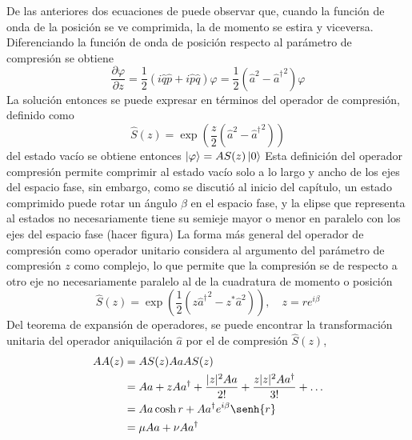 De las anteriores dos ecuaciones de puede observar que, cuando la función de onda de la posición se ve comprimida, la de momento se estira y viceversa. Diferenciando la función de onda de posición respecto al parámetro de compresión se obtiene \cite{Leonhardt}
\begin{equation*}
  \frac{\partial \varphi}{\partial z} = \frac{1}{2}\left( i\hat{q}\hat{p} + i\hat{p}\hat{q} \right)\varphi = \frac{1}{2}\left( {\hat{a}}^2 - {\hat{a}^{\dagger}}^2 \right)\varphi
\end{equation*}
La solución entonces se puede expresar en términos del operador de compresión, definido como
\begin{equation*}
  \hat{S}(z) = \exp{\left( \frac{z}{2}(\hat{a}^2 - {\hat{a}^{\dagger}}^2) \right)}
\end{equation*}
del estado vacío se obtiene entonces $\ket{\varphi} = A{S}(z)\ket{0}$
Esta definición del operador compresión permite comprimir al estado vacío solo a lo largo y ancho de los ejes del espacio fase, sin embargo, como se discutió al inicio del capítulo, un estado comprimido puede rotar un ángulo $\beta$ en el espacio fase, y la elipse que representa al estados no necesariamente tiene su semieje mayor o menor en paralelo con los ejes del espacio fase (hacer figura)
La forma más general del operador de compresión como operador unitario considera al argumento del parámetro de compresión $z$ como complejo, lo que permite que la compresión se de respecto a otro eje no necesariamente paralelo al de la cuadratura de momento o posición \cite{Loudon}
\begin{equation*}
  \hat{S}(z) = \exp{\left( \frac{1}{2} (z{\hat{a}^{\dagger}}^2 - z^* {\hat{a}}^2) \right)}, \quad z = re^{i\beta}
\end{equation*}
Del teorema de expansión de operadores, se puede encontrar la transformación unitaria del operador aniquilación $\hat{a}$ por el de compresión $\hat{S}(z)$,
\begin{align*}
  \hat{A}(z) & = \hat{S}(z)\hat{a} \hat{S}(z)                                                                       \\
             & = \hat{a}  + z\hat{a}^{\dagger} + \frac{|z|^2\hat{a}}{2!} + \frac{z|z|^2\hat{a}^{\dagger}}{3!}+\dots \\
             & = \hat{a} \cosh{r} + \hat{a}^{\dagger} e^{i\beta}\senh{r}                                            \\
             & = \mu\hat{a} + \nu\hat{a}^{\dagger}
\end{align*}
